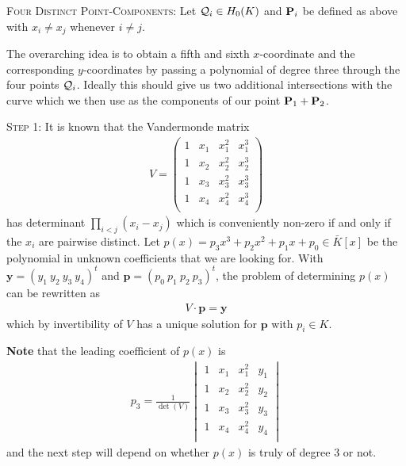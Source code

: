 \documentclass[english,11pt,a4paper]{article}
\begin{document}
\begin{case} {\scshape Four Distinct Point-Components:}
	Let $\q_i \in \enk$ and $\P_i$ be defined as above with $x_i \neq x_j$ whenever $i \neq j$.

	The overarching idea is to obtain a fifth and sixth $x$-coordinate and the corresponding $y$-coordinates by passing a polynomial of degree three through the four points $\q_i$. Ideally this should give us two additional intersections with the curve which we then use as the components of our point $\P_1 + \P_2$.

	{\scshape Step 1:} It is known that the Vandermonde matrix
	\begin{align*}V=
		\begin{pmatrix}
			1 & x_1 & x_1^2 & x_1^3\\
			1 & x_2 & x_2^2 & x_2^3\\
			1 & x_3 & x_3^2 & x_3^3\\
			1 & x_4 & x_4^2 & x_4^3\\
		\end{pmatrix}
	\end{align*}
	has determinant $\prod_{i < j} (x_i-x_j)$ which is conveniently non-zero if and only if the $x_i$ are pairwise distinct. Let $p(x) = p_3 x^3 + p_2 x^2 + p_1 x + p_0 \in \bar K[x]$ be the polynomial in unknown coefficients that we are looking for. With $\textbf{y} = (y_1 \ y_2 \ y_3 \ y_4)^t$ and $\textbf{p} = (p_0 \ p_1 \ p_2 \ p_3)^t$, the problem of determining $p(x)$ can be rewritten as
	\begin{align*}
		V \cdot \mathbf{p} = \mathbf{y}
	\end{align*}
	which by invertibility of $V$ has a unique solution for $\mathbf{p}$ with $p_i\in K$.

	\textbf{Note} that the leading coefficient of $p(x)$ is
	\begin{align*}
	  p_3 = \frac{1}{\det (V)}
	  \begin{vmatrix}
			1 & x_1 & x_1^2 & y_1\\
			1 & x_2 & x_2^2 & y_2\\
			1 & x_3 & x_3^2 & y_3\\
			1 & x_4 & x_4^2 & y_4\\	  
	  \end{vmatrix}
	\end{align*}
	and the next step will depend on whether $p(x)$ is truly of degree 3 or not.


\end{case}
\end{document}
